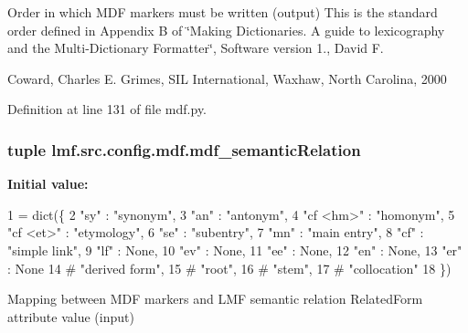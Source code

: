 Order in which M\+D\+F markers must be written (output) This is the standard order defined in Appendix B of \char`\"{}\+Making Dictionaries. A guide to lexicography and the Multi-\/\+Dictionary Formatter\char`\"{}, Software version 1., David F. 

Coward, Charles E. Grimes, S\+I\+L International, Waxhaw, North Carolina, 2000 

Definition at line 131 of file mdf.\+py.

\hypertarget{namespacelmf_1_1src_1_1config_1_1mdf_a20455cbc7aa64cc6eb4ad1749a381738}{
\subsubsection[{mdf\+\_\+semantic\+Relation}]{\setlength{\rightskip}{0pt plus 5cm}tuple lmf.\+src.\+config.\+mdf.\+mdf\+\_\+semantic\+Relation}}\label{namespacelmf_1_1src_1_1config_1_1mdf_a20455cbc7aa64cc6eb4ad1749a381738}
{\bfseries Initial value\+:}
\begin{DoxyCode}
1 = dict(\{
2     \textcolor{stringliteral}{"sy"} : \textcolor{stringliteral}{"synonym"},
3     \textcolor{stringliteral}{"an"} : \textcolor{stringliteral}{"antonym"},
4     \textcolor{stringliteral}{"cf <hm>"} : \textcolor{stringliteral}{"homonym"},
5     \textcolor{stringliteral}{"cf <et>"} : \textcolor{stringliteral}{"etymology"},
6     \textcolor{stringliteral}{"se"} : \textcolor{stringliteral}{"subentry"},
7     \textcolor{stringliteral}{"mn"} : \textcolor{stringliteral}{"main entry"},
8     \textcolor{stringliteral}{"cf"} : \textcolor{stringliteral}{"simple link"},
9     \textcolor{stringliteral}{"lf"} : \textcolor{keywordtype}{None},
10     \textcolor{stringliteral}{"ev"} : \textcolor{keywordtype}{None},
11     \textcolor{stringliteral}{"ee"} : \textcolor{keywordtype}{None},
12     \textcolor{stringliteral}{"en"} : \textcolor{keywordtype}{None},
13     \textcolor{stringliteral}{"er"} : \textcolor{keywordtype}{None}
14     \textcolor{comment}{# "derived form",}
15     \textcolor{comment}{# "root",}
16     \textcolor{comment}{# "stem",}
17     \textcolor{comment}{# "collocation"}
18 \})
\end{DoxyCode}


Mapping between M\+D\+F markers and L\+M\+F semantic relation Related\+Form attribute value (input) 



